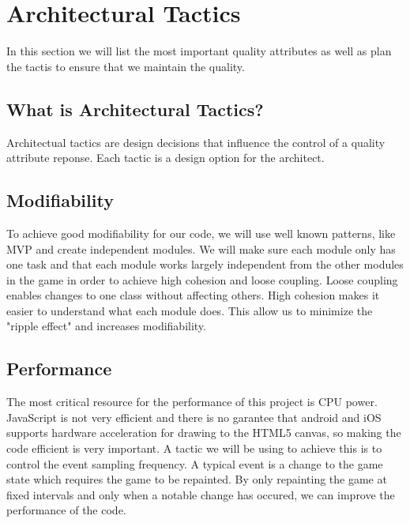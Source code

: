 \section{Architectural Tactics}
In this section we will list the most important quality attributes as well as plan the tactis to 
ensure that we maintain the quality.

\subsection*{What is Architectural Tactics? }
Architectual tactics are design decisions that influence the control of a quality attribute reponse. 
Each tactic is a design option for the architect. \cite{architecturalTactics}

\subsection*{Modifiability}
To achieve good modifiability for our code, we will use well known patterns, like MVP and create 
independent modules. We will make sure each module only has one task and that each module works 
largely independent from the other modules in the game in order to achieve high cohesion and loose 
coupling. Loose coupling enables changes to one class without affecting others. High cohesion makes 
it easier to understand what each module does. This allow us to minimize the "ripple effect" and 
increases modifiability.

\subsection*{Performance}
The most critical resource for the performance of this project is CPU power. JavaScript is not very 
efficient and there is no garantee that android and iOS supports hardware acceleration for drawing 
to the HTML5 canvas, so making the code efficient is very important. A tactic we will be using to 
achieve this is to control the event sampling frequency. A typical event is a change to the game 
state which requires the game to be repainted. By only repainting the game at fixed intervals and 
only when a notable change has occured, we can improve the performance of the code.
